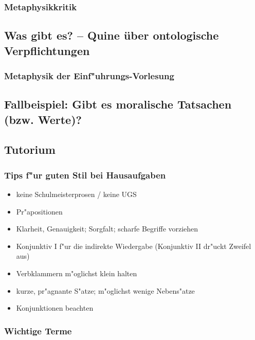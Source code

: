 \documentclass[emulatestandardclasses]{scrartcl}
\begin{document}
\subsubsection{Metaphysikkritik}


\subsection{Was gibt es? -- Quine über ontologische Verpflichtungen}


\subsubsection{Metaphysik der Einf"uhrungs-Vorlesung}



\subsection{Fallbeispiel: Gibt es moralische Tatsachen (bzw. Werte)?}

\subsection{Tutorium}
\subsubsection{Tips f"ur guten Stil bei Hausaufgaben}

\begin{itemize}
  \item keine Schulmeisterprosen / keine UGS
  \item Pr"apositionen
  \item Klarheit, Genauigkeit; Sorgfalt; scharfe Begriffe vorziehen
  \item Konjunktiv I f"ur die indirekte Wiedergabe (Konjunktiv II dr"uckt Zweifel aus)
  \item Verbklammern m"oglichst klein halten
  \item kurze, pr"agnante S"atze; m"oglichst wenige Nebens"atze
  \item Konjunktionen beachten
\end{itemize}

\subsubsection{Wichtige Terme}
\end{document}
